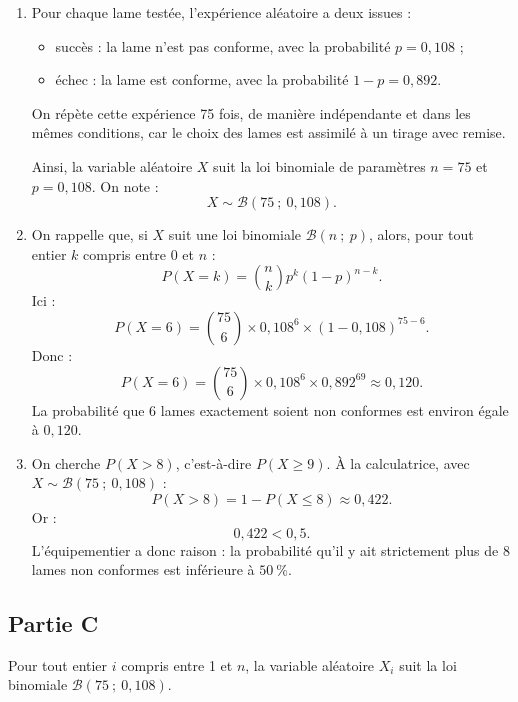 \documentclass[10pt]{article}
\begin{document}
\begin{enumerate}
	\item Pour chaque lame testée, l'expérience aléatoire a deux issues :
	\begin{itemize}[label={\textbullet~}]
		\item succès : la lame n'est pas conforme, avec la probabilité $p=0,108$ ;
		\item échec : la lame est conforme, avec la probabilité $1-p=0,892$.
	\end{itemize}
	On répète cette expérience 75 fois, de manière indépendante et dans les mêmes conditions, car le choix des lames est assimilé à un tirage avec remise.

	Ainsi, la variable aléatoire $X$ suit la loi binomiale de paramètres $n=75$ et $p=0,108$. On note :
	\[
	X\sim\mathcal{B}(75~;~0,108).
	\]

	\item On rappelle que, si $X$ suit une loi binomiale $\mathcal{B}(n~;~p)$, alors, pour tout entier $k$ compris entre 0 et $n$ :
	\[
	P(X=k)=\binom{n}{k}p^k(1-p)^{n-k}.
	\]
	Ici :
	\[
	P(X=6)=\binom{75}{6}\times 0,108^6\times (1-0,108)^{75-6}.
	\]
	Donc :
	\[
	P(X=6)=\binom{75}{6}\times 0,108^6\times 0,892^{69}\approx 0,120.
	\]
	La probabilité que 6 lames exactement soient non conformes est environ égale à $0,120$.

	\item On cherche $P(X>8)$, c'est-à-dire $P(X\geqslant 9)$.
	À la calculatrice, avec $X\sim\mathcal{B}(75~;~0,108)$ :
	\[
	P(X>8)=1-P(X\leqslant 8)\approx 0,422.
	\]
	Or :
	\[
	0,422<0,5.
	\]
	L'équipementier a donc raison : la probabilité qu'il y ait strictement plus de 8 lames non conformes est inférieure à $50~\%$.
\end{enumerate}

\subsection*{Partie C}

Pour tout entier $i$ compris entre 1 et $n$, la variable aléatoire $X_i$ suit la loi binomiale $\mathcal{B}(75~;~0,108)$.
\end{document}
